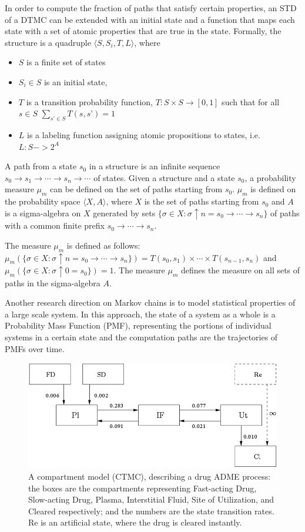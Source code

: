 In order to compute the fraction of paths that satisfy certain properties, an STD of a DTMC can be extended with an initial state and a function that maps each state with a set of atomic properties that are true in the state. Formally, the structure is a quadruple $\langle S, S_i, T, L\rangle$, where
\begin{itemize}
\item $S$ is a finite set of states
\item $S_i\in S$ is an initial state,
\item $T$ is a transition probability function, $T: S\times S \rightarrow [0,1]$ such that for all $s\in S$
$\sum_{s’\in S} T(s,s’) = 1$
\item $L$ is a labeling function assigning atomic propositions to states, i.e. $L: S->2^A$
\end{itemize}


A path from a state $s_0$ in a structure is an infinite sequence
$s_0 \rightarrow s_1 \rightarrow \cdots \rightarrow s_n \rightarrow\cdots$ of states. Given a structure and a state $s_0$, a probability measure $\mu_m$ can be defined on the set of paths starting from $s_0$. $\mu_m$ is defined on the probability space $\langle X, A\rangle$, where $X$ is the set of paths starting from $s_0$ and $A$ is a sigma-algebra on $X$ generated by sets $\{\sigma \in X: \sigma\uparrow n = s_0 \rightarrow\cdots\rightarrow s_n\}$ of paths with a common finite prefix $s_0\rightarrow\cdots\rightarrow s_n$.

The measure $\mu_m$ is defined as follows:
$\mu_m(\{\sigma \in X: \sigma\uparrow n = s_0 \rightarrow\cdots\rightarrow s_n\}) = 
T(s_0,s_1)\times\cdots\times T(s_{n-1},s_n)$ and $\mu_m(\{\sigma \in X: \sigma\uparrow 0 = s_0\}) = 1$. The measure $\mu_m$ defines the measure on all sets of paths in the sigma-algebra $A$.


Another research direction on Markov chains is to model statistical properties of a large scale system. In this approach, the state of a system as a whole is a Probability Mass Function (PMF), representing the portions of individual systems in a certain state and the computation paths are the trajectories of PMFs over time.

\begin{figure}
\centering
\includegraphics[width=.6\columnwidth]{assets/compartment_model.png}
\caption{
    A compartment model (CTMC), describing a drug ADME process: the boxes are the compartments representing Fast-acting Drug, Slow-acting Drug, Plasma, Interstitial Fluid, Site of Utilization, and Cleared respectively; and the numbers are the state transition rates. Re is an artificial state, where the drug is cleared instantly.}
\label{fig:comparment}
\end{figure}

